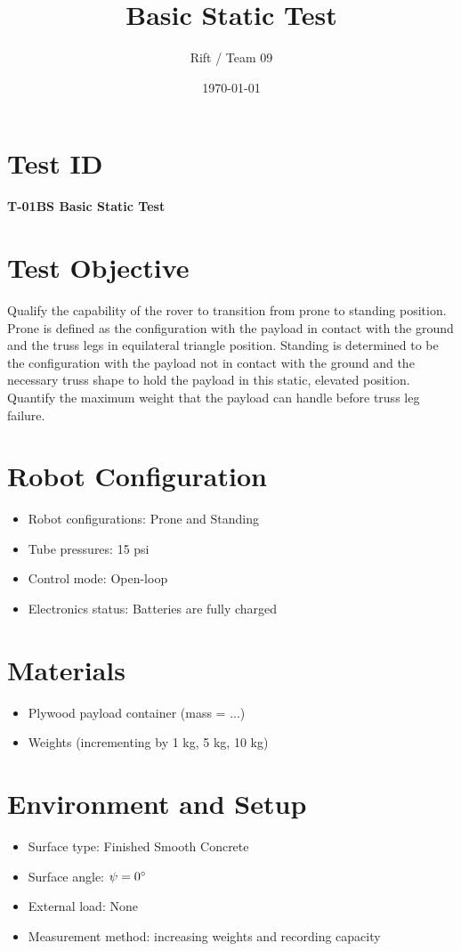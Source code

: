 \documentclass[11pt]{article}
\title{Basic Static Test}
\author{Rift / Team 09}
\date{\today}
\begin{document}
\maketitle

\section*{Test ID}
\textbf{T-01BS Basic Static Test} 

\section*{Test Objective}
Qualify the capability of the rover to transition from prone to standing position. Prone is defined as the configuration with the payload in contact with the ground and the truss legs in equilateral triangle position. Standing is determined to be the configuration with the payload not in contact with the ground and the necessary truss shape to hold the payload in this static, elevated position. Quantify the maximum weight that the payload can handle before truss leg failure.

\section*{Robot Configuration}
\begin{itemize}[noitemsep]
    \item Robot configurations: Prone and Standing
    \item Tube pressures: 15 psi
    \item Control mode: Open-loop
    \item Electronics status: Batteries are fully charged
\end{itemize}

\section*{Materials}
\begin{itemize}[noitemsep]
    \item Plywood payload container (mass = ...)
    \item Weights (incrementing by 1 kg, 5 kg, 10 kg)
    
\end{itemize}

\section*{Environment and Setup}
\begin{itemize}[noitemsep]
    \item Surface type: Finished Smooth Concrete
    \item Surface angle: $\psi = 0 {\degree}$ 
    \item External load: None 
    \item Measurement method: increasing weights and recording capacity
\end{itemize}
\end{document}
